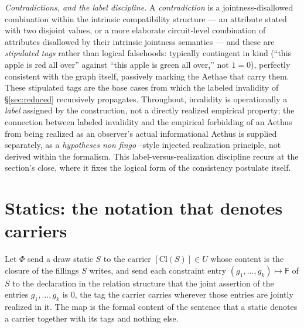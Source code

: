 \textit{Contradictions, and the label discipline.} A \emph{contradiction} is a jointness-disallowed combination within the intrinsic compatibility structure --- an attribute stated with two disjoint values, or a more elaborate circuit-level combination of attributes disallowed by their intrinsic jointness semantics --- and these are \emph{stipulated tags} rather than logical falsehoods: typically contingent in kind (``this apple is red all over'' against ``this apple is green all over,'' not $1 = 0$), perfectly consistent with the graph itself, passively marking the Aethae that carry them. These stipulated tags are the base cases from which the labeled invalidity of §\ref{sec:reduced} recursively propagates. Throughout, invalidity is operationally a \emph{label} assigned by the construction, not a directly realized empirical property; the connection between labeled invalidity and the empirical forbidding of an Aethus from being realized as an observer's actual informational Aethus is supplied separately, as a \emph{hypotheses non fingo} \cite{newton1687principia}--style injected realization principle, not derived within the formalism. This label-versus-realization discipline recurs at the section's close, where it fixes the logical form of the consistency postulate itself.

\section{Statics: the notation that denotes carriers}\label{sec:statics}

\begin{defin}\label{def:statics-map}
Let $\Phi$ send a draw static $S$ to the carrier $[\mathrm{Cl}(S)] \in U$ whose content is the closure of the fillings $S$ writes, and send each constraint entry $(g_1, \ldots, g_k) \mapsto \mathsf{F}$ of $S$ to the declaration in the relation structure that the joint assertion of the entries $g_1, \ldots, g_k$ is $0$, the tag the carrier carries wherever those entries are jointly realized in it. The map is the formal content of the sentence that a static denotes a carrier together with its tags and nothing else. \end{defin}

